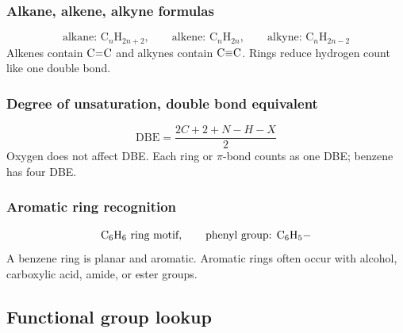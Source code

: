 \subsubsection{Alkane, alkene, alkyne formulas}
\begin{equation}
\label{eq:organic:hydrocarbon-formulas}
\text{alkane: }\mathrm{C}_n\mathrm{H}_{2n+2}, \qquad
\text{alkene: }\mathrm{C}_n\mathrm{H}_{2n}, \qquad
\text{alkyne: }\mathrm{C}_n\mathrm{H}_{2n-2}
\end{equation}
Alkenes contain \(\ce{C=C}\) and alkynes contain \(\ce{C#C}\). Rings reduce hydrogen count like one double bond.

\subsubsection{Degree of unsaturation, double bond equivalent}
\begin{equation}
\label{eq:organic:dbe}
\mathrm{DBE}=\frac{2C+2+N-H-X}{2}
\end{equation}
Oxygen does not affect DBE. Each ring or \(\pi\)-bond counts as one DBE; benzene has four DBE.

\subsubsection{Aromatic ring recognition}
\begin{equation}
\label{eq:organic:aromatic-motif}
\ce{C6H6}\ \text{ring motif}, \qquad \text{phenyl group: }\mathrm{C_6H_5{-}}
\end{equation}
A benzene ring is planar and aromatic. Aromatic rings often occur with alcohol, carboxylic acid, amide, or ester groups.

\subsection{Functional group lookup}


